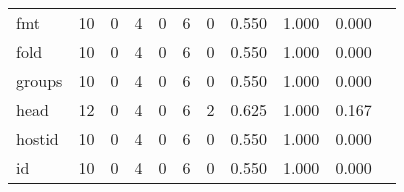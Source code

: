 \begin{longtable}{lp{1.20cm}p{1.20cm}p{1.20cm}p{1.20cm}p{1.20cm}p{1.20cm}p{1.20cm}p{1.20cm}p{1.20cm}p{1.20cm}}
fmt       &                                    10 &                                                  0 &                                                  4 &                                                  0 &                                                  6 &                                                  0 &                                         0.550 &                                              1.000 &                                              0.000 \\
fold      &                                    10 &                                                  0 &                                                  4 &                                                  0 &                                                  6 &                                                  0 &                                         0.550 &                                              1.000 &                                              0.000 \\
groups    &                                    10 &                                                  0 &                                                  4 &                                                  0 &                                                  6 &                                                  0 &                                         0.550 &                                              1.000 &                                              0.000 \\
head      &                                    12 &                                                  0 &                                                  4 &                                                  0 &                                                  6 &                                                  2 &                                         0.625 &                                              1.000 &                                              0.167 \\
hostid    &                                    10 &                                                  0 &                                                  4 &                                                  0 &                                                  6 &                                                  0 &                                         0.550 &                                              1.000 &                                              0.000 \\
id        &                                    10 &                                                  0 &                                                  4 &                                                  0 &                                                  6 &                                                  0 &                                         0.550 &                                              1.000 &                                              0.000 \\

\end{longtable}
